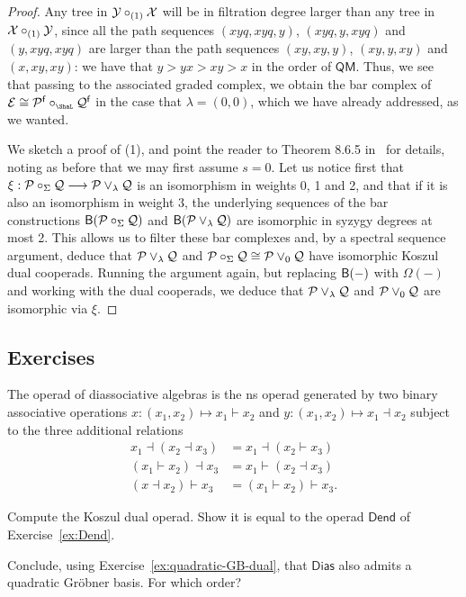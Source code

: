 \begin{proof}
Any tree in $\mathcal{Y}\circ_{(1)}\mathcal{X}$ will be
in filtration degree larger than any tree
in $\mathcal{X}\circ_{(1)}\mathcal{Y}$, since all the path 
sequences
$(xyq,xyq,y)$, $(xyq,y,xyq)$ and $(y,xyq,xyq)$
are larger than the path sequences 
$(xy,xy,y)$, $(xy,y,xy)$ and $(x,xy,xy)$:
we have that $y > yx > xy > x$ in the order of 
$\mathsf{QM}$. Thus, we see that passing
to the associated graded complex, we obtain
the bar complex of $\mathcal E\cong \PP^\f\circ_\Sha\QQ^\f$
in the case that $\lambda = (0,0)$, which
we have already addressed, as we wanted. 

We sketch a proof of (1), and point
the reader to Theorem 8.6.5 in~\cite{Loday2012}
for details, noting as before that we
may first assume $s=0$.
Let us notice first that
$\xi: \mathcal P\circ_\Sigma\mathcal{Q}\longrightarrow
 \mathcal P\vee_\lambda \mathcal{Q}$ is an isomorphism in
 weights 0, 1 and 2, and that if it is also
 an isomorphism in weight 3, the underlying
 sequences of the bar
 constructions $\mathsf{B}(\mathcal P\circ_\Sigma\mathcal{Q})$
 and $\mathsf{B}(\mathcal P\vee_\lambda \mathcal{Q})$ are isomorphic
 in syzygy degrees at most 2. This allows us
 to filter these bar complexes and, by a 
 spectral sequence argument, deduce that
 $\mathcal P\vee_\lambda \mathcal{Q}$ and $\mathcal P\circ_\Sigma\mathcal{Q}\cong
  \mathcal P\vee_0 \mathcal{Q}$ have isomorphic Koszul dual
 cooperads. Running the argument again, but
 replacing $\mathsf{B}(-)$ with $\Omega(-)$ and 
 working with the dual cooperads, we deduce
 that  $\mathcal P\vee_\lambda \mathcal{Q}$ and $\mathcal P\vee_0 \mathcal{Q}$ are isomorphic via $\xi$.
\end{proof}
 

\subsection{Exercises}

\begin{question}
The operad of diassociative algebras is the
ns operad generated by two binary 
associative operations
$x: (x_1,x_2) \longmapsto x_1\vdash x_2$ and
$y: (x_1,x_2) \longmapsto x_1\dashv x_2$ subject
to the three additional relations
\begin{align*}
 x_1 \dashv (x_2 \dashv x_3) &= x_1 \dashv (x_2 \vdash x_3) \\
 (x_1 \vdash x_2) \dashv x_3 &= x_1 \vdash (x_2 \dashv x_3) \\
(x \dashv x_2) \vdash x_3 &= (x_1 \vdash x_2) \vdash x_3.
\end{align*}
\begin{tenumerate}
\item Compute the Koszul dual operad. Show
it is equal to the operad $\mathsf{Dend}$
of Exercise~\ref{ex:Dend}.
\item Conclude, using Exercise~\ref{ex:quadratic-GB-dual}, that $\mathsf{Dias}$ also admits
a quadratic Gr\"obner basis. For which
order?
\end{tenumerate}
\end{question}

